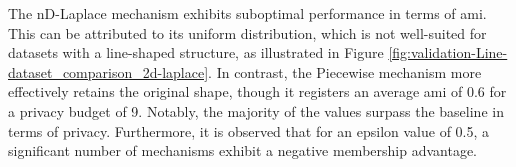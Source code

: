 The nD-Laplace mechanism exhibits suboptimal performance in terms of \gls{ami}. This can be attributed to its uniform distribution, which is not well-suited for datasets with a line-shaped structure, as illustrated in Figure \ref{fig:validation-Line-dataset_comparison_2d-laplace}. In contrast, the Piecewise mechanism more effectively retains the original shape, though it registers an average \gls{ami} of 0.6 for a privacy budget of 9. Notably, the majority of the values surpass the baseline in terms of privacy. Furthermore, it is observed that for an epsilon value of 0.5, a significant number of mechanisms exhibit a negative membership advantage.